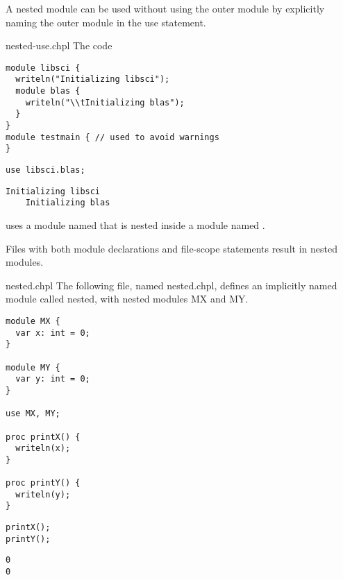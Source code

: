 A nested module can be used without using the outer module by
explicitly naming the outer module in the use statement.
\begin{chapelexample}{nested-use.chpl}
The code
\begin{chapelpre}
\begin{verbatim}
module libsci {
  writeln("Initializing libsci");
  module blas {
    writeln("\\tInitializing blas");
  }
}
module testmain { // used to avoid warnings
}
\end{verbatim}
\end{chapelpre}
\begin{chapel}
\begin{verbatim}
use libsci.blas;
\end{verbatim}
\end{chapel}
\begin{chapeloutput}
\begin{verbatim}
Initializing libsci
	Initializing blas
\end{verbatim}
\end{chapeloutput}
uses a module named  that is nested inside a module
named .
\end{chapelexample}

Files with both module declarations and file-scope statements result in
nested modules.

\begin{chapelexample}{nested.chpl}
The following file, named nested.chpl, defines an
implicitly named module called nested, with nested modules
MX and MY.
\begin{chapel}
\begin{verbatim}
module MX {
  var x: int = 0;
}

module MY {
  var y: int = 0;
}

use MX, MY;

proc printX() {
  writeln(x);
}

proc printY() {
  writeln(y);
}
\end{verbatim}
\end{chapel}
\begin{chapelpost}
\begin{verbatim}
printX();
printY();
\end{verbatim}
\end{chapelpost}
\begin{chapeloutput}
\begin{verbatim}
0
0
\end{verbatim}
\end{chapeloutput}
\end{chapelexample}


